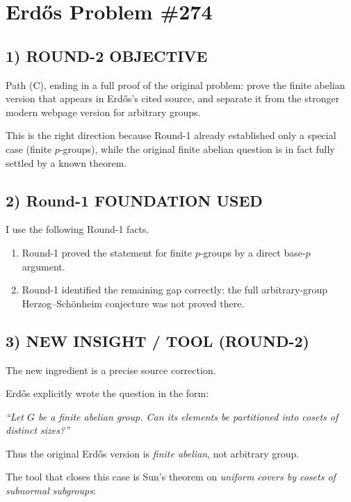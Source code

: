 \section*{Erd\H{o}s Problem \#274}

\subsection*{1) ROUND-2 OBJECTIVE}

Path (C), ending in a full proof of the original problem: prove the finite abelian version that appears in Erd\H{o}s's cited source, and separate it from the stronger modern webpage version for arbitrary groups.

This is the right direction because Round-1 already established only a special case (finite $p$-groups), while the original finite abelian question is in fact fully settled by a known theorem.

\subsection*{2) Round-1 FOUNDATION USED}

I use the following Round-1 facts.

\begin{enumerate}
\item Round-1 proved the statement for finite $p$-groups by a direct base-$p$ argument.
\item Round-1 identified the remaining gap correctly: the full arbitrary-group Herzog--Sch\"onheim conjecture was not proved there.
\end{enumerate}

\subsection*{3) NEW INSIGHT / TOOL (ROUND-2)}

The new ingredient is a precise source correction.

Erd\H{o}s explicitly wrote the question in the form:

\medskip
\centerline{\emph{``Let $G$ be a finite abelian group.  Can its elements be partitioned into cosets of distinct sizes?''}}
\medskip

Thus the original Erd\H{o}s version is \emph{finite abelian}, not arbitrary group.

The tool that closes this case is Sun's theorem on \emph{uniform covers by cosets of subnormal subgroups}:

